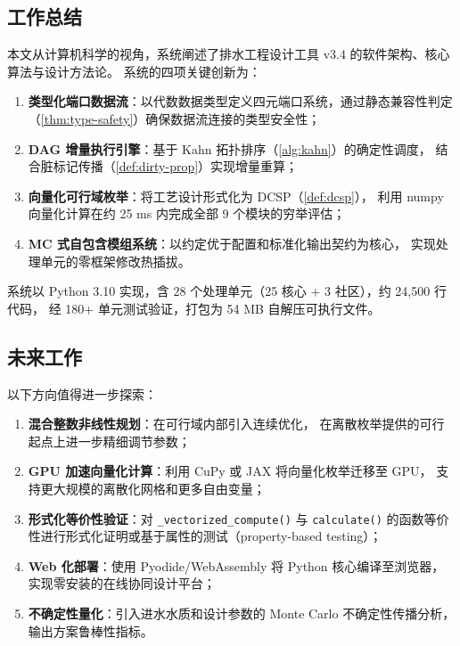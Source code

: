 \documentclass[12pt,a4paper]{ctexart}
\theoremstyle{definition}
\theoremstyle{remark}
\begin{document}
\subsection{工作总结}

本文从计算机科学的视角，系统阐述了排水工程设计工具 v3.4 的软件架构、核心算法与设计方法论。
系统的四项关键创新为：

\begin{enumerate}
  \item \textbf{类型化端口数据流}：以代数数据类型定义四元端口系统，通过静态兼容性判定
        （\cref{thm:type-safety}）确保数据流连接的类型安全性；
  \item \textbf{DAG 增量执行引擎}：基于 Kahn 拓扑排序（\cref{alg:kahn}）的确定性调度，
        结合脏标记传播（\cref{def:dirty-prop}）实现增量重算；
  \item \textbf{向量化可行域枚举}：将工艺设计形式化为 DCSP（\cref{def:dcsp}），
        利用 numpy 向量化计算在约 25 ms 内完成全部 9 个模块的穷举评估；
  \item \textbf{MC 式自包含模组系统}：以约定优于配置和标准化输出契约为核心，
        实现处理单元的零框架修改热插拔。
\end{enumerate}

系统以 Python 3.10 实现，含 28 个处理单元（25 核心 + 3 社区），约 24,500 行代码，
经 180+ 单元测试验证，打包为 54 MB 自解压可执行文件。

\subsection{未来工作}

以下方向值得进一步探索：
\begin{enumerate}
  \item \textbf{混合整数非线性规划}：在可行域内部引入连续优化，
        在离散枚举提供的可行起点上进一步精细调节参数；
  \item \textbf{GPU 加速向量化计算}：利用 CuPy 或 JAX 将向量化枚举迁移至 GPU，
        支持更大规模的离散化网格和更多自由变量；
  \item \textbf{形式化等价性验证}：对 \texttt{\_vectorized\_compute()} 与
        \texttt{calculate()} 的函数等价性进行形式化证明或基于属性的测试（property-based testing）；
  \item \textbf{Web 化部署}：使用 Pyodide/WebAssembly 将 Python 核心编译至浏览器，
        实现零安装的在线协同设计平台；
  \item \textbf{不确定性量化}：引入进水水质和设计参数的 Monte Carlo 不确定性传播分析，
        输出方案鲁棒性指标。
\end{enumerate}
\end{document}
